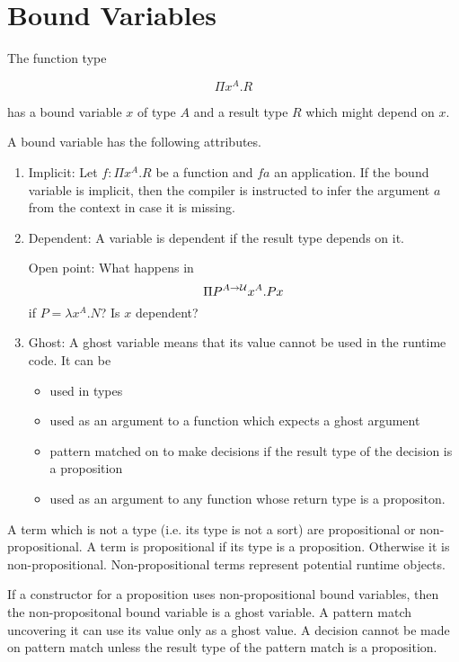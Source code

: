 \section{Bound Variables}

The function type

$$
\Pi x^A. R
$$

has a bound variable $x$ of type $A$ and a result type $R$ which might depend on
$x$.

A bound variable has the following attributes.

\begin{enumerate}

    \item Implicit: Let $f: \Pi x^A. R$ be a function and $f a$ an application.
        If the bound variable is implicit, then the compiler is instructed to
        infer the argument $a$ from the context in case it is missing.

    \item Dependent: A variable is dependent if the result type depends on it.

        Open point: What happens in
        $$
            \Pi P^{A \to {\cal U}} x^A. P x
        $$
        if $P = \lambda x^A . N$? Is $x$ dependent?

    \item Ghost: A ghost variable means that its value cannot be used in the
        runtime code. It can be

        \begin{itemize}
            \item used in types

            \item used as an argument to a function which expects a ghost argument

            \item pattern matched on to make decisions if the result type of the
                decision is a proposition

            \item used as an argument to any function whose return type is a
                propositon.

        \end{itemize}
\end{enumerate}

A term which is not a type (i.e. its type is not a sort) are propositional or
non-propositional. A term is propositional if its type is a proposition.
Otherwise it is non-propositional. Non-propositional terms represent potential
runtime objects.

If a constructor for a proposition uses non-propositional bound variables, then the
non-propositonal bound variable is a ghost variable. A pattern match uncovering
it can use its value only as a ghost value. A decision cannot be made on pattern
match unless the result type of the pattern match is a proposition.

